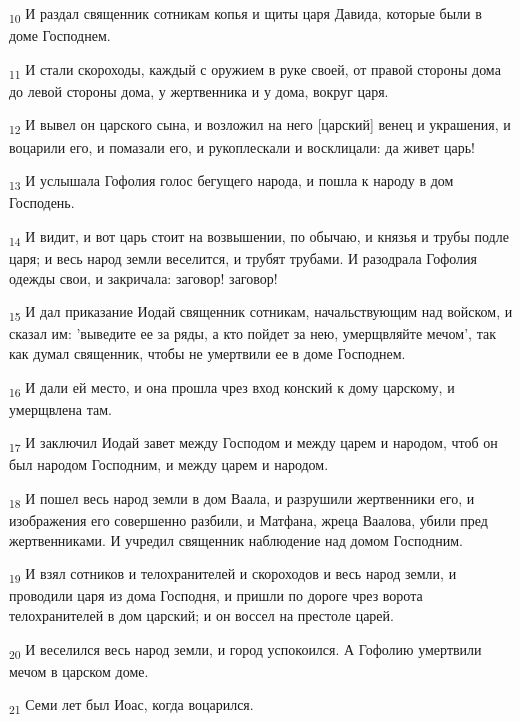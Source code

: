 \begin{tcolorbox}
\textsubscript{10} И раздал священник сотникам копья и щиты царя Давида, которые были в доме Господнем.
\end{tcolorbox}
\begin{tcolorbox}
\textsubscript{11} И стали скороходы, каждый с оружием в руке своей, от правой стороны дома до левой стороны дома, у жертвенника и у дома, вокруг царя.
\end{tcolorbox}
\begin{tcolorbox}
\textsubscript{12} И вывел он царского сына, и возложил на него [царский] венец и украшения, и воцарили его, и помазали его, и рукоплескали и восклицали: да живет царь!
\end{tcolorbox}
\begin{tcolorbox}
\textsubscript{13} И услышала Гофолия голос бегущего народа, и пошла к народу в дом Господень.
\end{tcolorbox}
\begin{tcolorbox}
\textsubscript{14} И видит, и вот царь стоит на возвышении, по обычаю, и князья и трубы подле царя; и весь народ земли веселится, и трубят трубами. И разодрала Гофолия одежды свои, и закричала: заговор! заговор!
\end{tcolorbox}
\begin{tcolorbox}
\textsubscript{15} И дал приказание Иодай священник сотникам, начальствующим над войском, и сказал им: 'выведите ее за ряды, а кто пойдет за нею, умерщвляйте мечом', так как думал священник, чтобы не умертвили ее в доме Господнем.
\end{tcolorbox}
\begin{tcolorbox}
\textsubscript{16} И дали ей место, и она прошла чрез вход конский к дому царскому, и умерщвлена там.
\end{tcolorbox}
\begin{tcolorbox}
\textsubscript{17} И заключил Иодай завет между Господом и между царем и народом, чтоб он был народом Господним, и между царем и народом.
\end{tcolorbox}
\begin{tcolorbox}
\textsubscript{18} И пошел весь народ земли в дом Ваала, и разрушили жертвенники его, и изображения его совершенно разбили, и Матфана, жреца Ваалова, убили пред жертвенниками. И учредил священник наблюдение над домом Господним.
\end{tcolorbox}
\begin{tcolorbox}
\textsubscript{19} И взял сотников и телохранителей и скороходов и весь народ земли, и проводили царя из дома Господня, и пришли по дороге чрез ворота телохранителей в дом царский; и он воссел на престоле царей.
\end{tcolorbox}
\begin{tcolorbox}
\textsubscript{20} И веселился весь народ земли, и город успокоился. А Гофолию умертвили мечом в царском доме.
\end{tcolorbox}
\begin{tcolorbox}
\textsubscript{21} Семи лет был Иоас, когда воцарился.
\end{tcolorbox}
